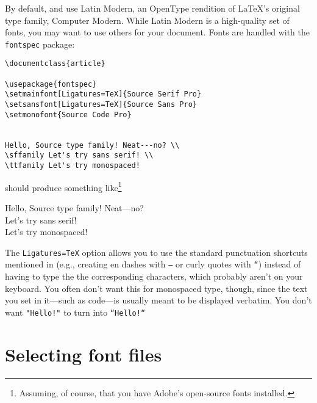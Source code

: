 By default, \LuaLaTeX{} and \XeLaTeX{} use Latin Modern,
an OpenType rendition of \LaTeX's original type family, Computer Modern.
While Latin Modern is a high-quality set of fonts,
you may want to use others for your document.
Fonts are handled with the \texttt{fontspec} package:
\begin{leftfigure}
\begin{lstlisting}
\documentclass{article}

\usepackage{fontspec}
\setmainfont[Ligatures=TeX]{Source Serif Pro}
\setsansfont[Ligatures=TeX]{Source Sans Pro}
\setmonofont{Source Code Pro}


Hello, Source type family! Neat---no? \\
\sffamily Let's try sans serif! \\
\ttfamily Let's try monospaced!

\end{lstlisting}
\end{leftfigure}
should produce something like\footnote{Assuming, of course,
that you have Adobe's open-source fonts installed.\punckern{}}
\begin{leftfigure}
 Hello, Source type family! Neat---no? \\
 Let's try sans serif! \\
 Let's try monospaced!
\end{leftfigure}
The \verb|Ligatures=TeX| option allows you to use the standard punctuation
shortcuts mentioned in  (e.g., creating en dashes with
\texttt{--} or curly quotes with \texttt{``}) instead of having
to type the the corresponding characters, which probably aren't on your keyboard.
You often don't want this for monospaced type, though,
since the text you set in it---such as code---is usually meant to be displayed
verbatim. You don't want \verb|"Hello!"| to turn into
\verb|“Hello!“|

\section{Selecting font files}

